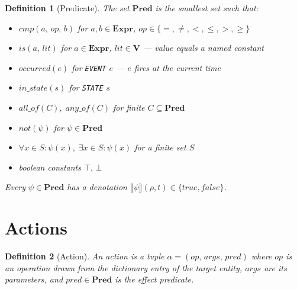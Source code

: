 \documentclass{article}
\newtheorem{definition}{Definition}
\begin{document}
\begin{definition}[Predicate]
    The set $\mathbf{Pred}$ is the smallest set such that:
    \begin{itemize}
        \item $\mathit{cmp}(a,\, \mathit{op},\, b)$ for $a, b \in \mathbf{Expr}$,\; $\mathit{op} \in \{=,\neq,<,\leq,>,\geq\}$
        \item $\mathit{is}(a,\, \mathit{lit})$ for $a \in \mathbf{Expr}$, $\mathit{lit} \in \mathbf{V}$ — value equals a named constant
        \item $\mathit{occurred}(e)$ for \texttt{EVENT} $e$ — $e$ fires at the current time
        \item $\mathit{in\_state}(s)$ for \texttt{STATE} $s$
        \item $\mathit{all\_of}(C),\; \mathit{any\_of}(C)$ for finite $C \subseteq \mathbf{Pred}$
        \item $\mathit{not}(\psi)$ for $\psi \in \mathbf{Pred}$
        \item $\forall x \in S:\psi(x),\; \exists x \in S:\psi(x)$ for a finite set $S$
        \item boolean constants $\top,\, \bot$
    \end{itemize}
    Every $\psi \in \mathbf{Pred}$ has a denotation $\llbracket\psi\rrbracket(\rho, t) \in \{\mathit{true}, \mathit{false}\}$.
\end{definition}

\section{Actions}

\begin{definition}[Action]
    An action is a tuple $\alpha = (\mathit{op},\, \mathit{args},\, \mathit{pred})$ where $\mathit{op}$ is an operation drawn from the dictionary entry of the target entity, $\mathit{args}$ are its parameters, and $\mathit{pred} \in \mathbf{Pred}$ is the effect predicate.
\end{definition}
\end{document}
